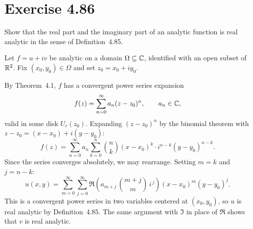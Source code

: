\documentclass{article}
\begin{document}
\section{Exercise 4.86}

Show that the real part and the imaginary part of an analytic function
is real analytic in the sense of Definition~4.85.

\begin{solution}
  Let $f = u + iv$ be analytic on a domain $\Omega \subseteq \mathbb{C}$,
  identified with an open subset of $\mathbb{R}^2$. Fix $(x_0, y_0) \in \Omega$
  and set $z_0 = x_0 + iy_0$.

  By Theorem~4.1, $f$ has a convergent power series expansion
  \[
    f(z) = \sum_{n=0}^{\infty} a_n (z - z_0)^n,
    \qquad a_n \in \mathbb{C},
  \]
  valid in some disk $U_r(z_0)$. Expanding $(z - z_0)^n$ by the
  binomial theorem with $z - z_0 = (x - x_0) + i(y - y_0)$:
  \[
    f(z) = \sum_{n=0}^{\infty} a_n
    \sum_{k=0}^{n} \binom{n}{k}
    (x - x_0)^k \cdot i^{n-k}(y - y_0)^{n-k}.
  \]
  Since the series converges absolutely, we may rearrange. Setting
  $m = k$ and $j = n - k$:
  \[
    u(x,y) = \sum_{m=0}^{\infty} \sum_{j=0}^{\infty}
    \Re\!\left(a_{m+j}\,\binom{m+j}{m}\,i^{\,j}\right)
    (x - x_0)^m (y - y_0)^j.
  \]
  This is a convergent power series in two variables centered at
  $(x_0, y_0)$, so $u$ is real analytic by Definition~4.85.
  The same argument with $\Im$ in place of $\Re$ shows that $v$ is
  real analytic.
\end{solution}
\end{document}
